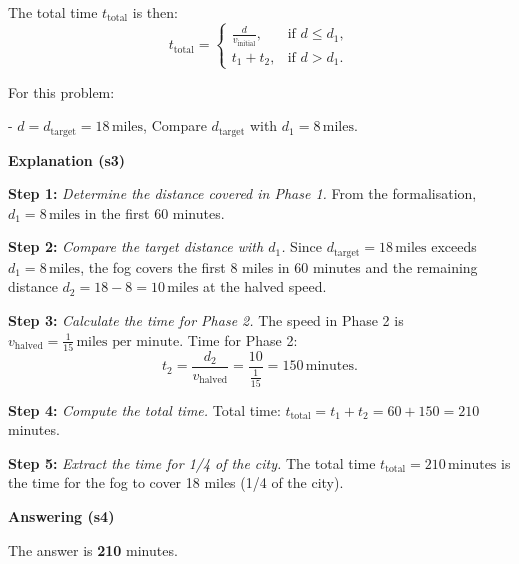 \documentclass[11pt]{article}
\begin{document}
\begin{table*}[]
\begin{small}
\begin{tcolorbox}[colback=white, colframe=lightblue, rounded corners]
\hspace*{0.5cm} The total time \(t_{\text{total}}\) is then:
\[
t_{\text{total}} = 
\begin{cases} 
\frac{d}{v_{\text{initial}}}, & \text{if } d \leq d_1, \\
t_1 + t_2, & \text{if } d > d_1.
\end{cases}
\]

\hspace*{0.5cm} For this problem:

\hspace*{0.5cm} - \(d = d_{\text{target}} = 18 \, \text{miles}\), Compare \(d_{\text{target}}\) with \(d_1 = 8 \, \text{miles}\).

\textbf{Explanation (s3)}

\textbf{Step 1:} \textit{ Determine the distance covered in Phase 1.}  
From the formalisation, \(d_1 = 8 \, \text{miles}\) in the first 60 minutes.

\textbf{Step 2:} \textit{Compare the target distance with \(d_1\).}  
Since \(d_{\text{target}} = 18 \, \text{miles}\) exceeds \(d_1 = 8 \, \text{miles}\), the fog covers the first 8 miles in 60 minutes and the remaining distance \(d_2 = 18 - 8 = 10 \, \text{miles}\) at the halved speed.

\textbf{Step 3:} \textit{Calculate the time for Phase 2.}  
The speed in Phase 2 is \(v_{\text{halved}} = \frac{1}{15} \, \text{miles per minute}\).  
Time for Phase 2:
\[
t_2 = \frac{d_2}{v_{\text{halved}}} = \frac{10}{\frac{1}{15}} = 150 \, \text{minutes}.
\]

\textbf{Step 4:} \textit{Compute the total time.}  
Total time:
$t_{\text{total}} = t_1 + t_2 = 60 + 150 = 210 $ minutes.

\textbf{Step 5:} \textit{Extract the time for 1/4 of the city.}  
The total time \(t_{\text{total}} = 210 \, \text{minutes}\) is the time for the fog to cover 18 miles (1/4 of the city).

\textbf{Answering (s4)}

The answer is \textcolor{citecolor!80}{\textbf{210}} minutes.

\end{tcolorbox} 
\end{small}
\label{tab:example_GSM-Sym}
\end{table*}
\end{document}
